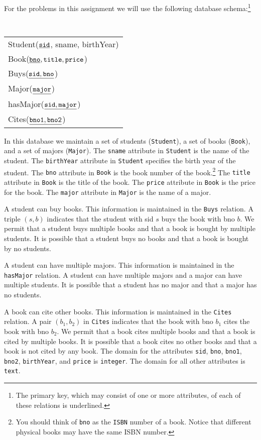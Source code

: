 \documentclass[11pt]{article}
\begin{document}
For the problems in this assignment we will use the following database schema:\footnote{The primary key, which may consist of one or more attributes, of each of these relations is underlined.}

\begin{center}
{\tt
  \begin{tabular}{l}
  {Student}($\underline{\tt sid}$, sname, birthYear) \\
  {Book}($\underline{\tt bno}, {\tt title}, {\tt price}$) \\
  {Buys}($\underline{\tt sid, bno}$) \\
  {Major}($\underline{\tt major}$) \\
  {hasMajor}($\underline{\tt sid, major}$) \\
  {Cites}($\underline{\tt bno1, bno2}$) \\
   \end{tabular}
  }
\end{center}

In this database we maintain a set of students ({\tt Student}), a set
of books ({\tt Book}), and a set of majors ({\tt Major}). 
The {\tt sname} attribute in {\tt Student} is the name of the student.  
The {\tt birthYear} attribute in {\tt Student} specifies the birth year of the student.
The {\tt bno} attribute in {\tt Book} is the book number of the book.\footnote{You should think of
{\tt bno} as the {\tt ISBN} number of a book.   Notice that different physical books may have the same
ISBN number.}
The {\tt title} attribute in {\tt Book} is the title of the book.
The {\tt price} attribute in {\tt Book} is the price for the book.
The {\tt major} attribute in {\tt Major} is the name of a major.

A  student can buy books. This information is maintained in the {\tt Buys} relation. A triple $(s,b)$ indicates that the student with sid $s$ buys the book with bno $b$. We permit that a student buys multiple books and that a book is bought by multiple students.   It is possible that a student buys no books and that a book is bought by no students.    

A  student can have multiple majors. This information is maintained in the {\tt hasMajor} relation.  A student can have multiple majors and
a major can have multiple students.  It is possible that a student has no major and that a major has no students.

A book can cite other books.   This information is maintained in the {\tt Cites} relation.  A pair $(b_1,b_2)$ in {\tt Cites} indicates that the book with bno $b_1$ cites the book with bno $b_2$.
We permit that a book cites multiple books and that a book is cited by multiple books.
It is possible that a book cites no other books and that a book is not cited by any book.   
The domain for the attributes {\tt sid}, {\tt bno}, {\tt bno1}, {\tt bno2}, {\tt birthYear}, and {\tt price} is {\tt integer}.   The domain for all other attributes is {\tt text}.
\end{document}
